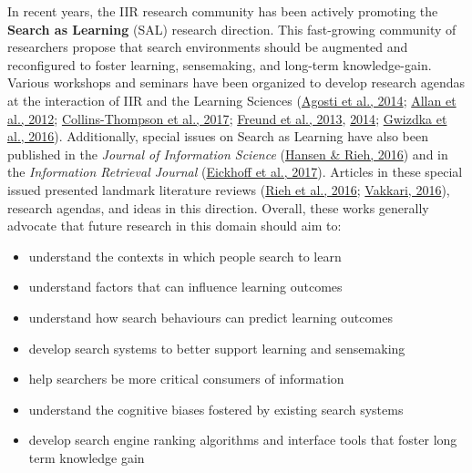 \documentclass[letterpaper, nobind]{templates/ociamthesis}
\providecommand{\tightlist}{%
  \setlength{\itemsep}{0pt}\setlength{\parskip}{0pt}}
\begin{document}
In recent years, the IIR research community has been actively promoting the \textbf{Search as Learning} (SAL) research direction.
This fast-growing community of researchers propose that search environments should be augmented and reconfigured to foster learning, sensemaking, and long-term knowledge-gain.
Various workshops and seminars have been organized to develop research agendas at the interaction of IIR and the Learning Sciences (\protect\hyperlink{ref-agosti2014evaluation}{Agosti et al., 2014}; \protect\hyperlink{ref-allan2012frontiers}{Allan et al., 2012}; \protect\hyperlink{ref-collins2017search}{Collins-Thompson et al., 2017}; \protect\hyperlink{ref-freund2013searching}{Freund et al., 2013}, \protect\hyperlink{ref-freund2014searching}{2014}; \protect\hyperlink{ref-gwizdka2016search}{Gwizdka et al., 2016}).
Additionally, special issues on Search as Learning have also been published in the \emph{Journal of Information Science} (\protect\hyperlink{ref-hansen2016editorial}{Hansen \& Rieh, 2016}) and in the \emph{Information Retrieval Journal} (\protect\hyperlink{ref-eickhoff2017introduction}{Eickhoff et al., 2017}).
Articles in these special issued presented landmark literature reviews (\protect\hyperlink{ref-rieh2016searching}{Rieh et al., 2016}; \protect\hyperlink{ref-vakkari2016searching}{Vakkari, 2016}), research agendas, and ideas
in this direction.
Overall, these works generally advocate that future research in this domain should aim to:

\begin{itemize}
\tightlist
\item
  understand the contexts in which people search to learn
\item
  understand factors that can influence learning outcomes
\item
  understand how search behaviours can predict learning outcomes
\item
  develop search systems to better support learning and sensemaking
\item
  help searchers be more critical consumers of information
\item
  understand the cognitive biases fostered by existing search systems
\item
  develop search engine ranking algorithms and interface tools that foster long term knowledge gain
\end{itemize}
\end{document}
